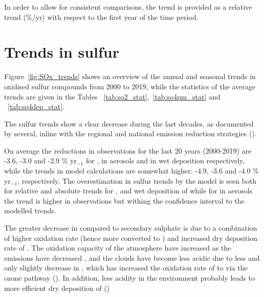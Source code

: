 In order to allow for consistent comparisons, the trend is provided as a relative trend (\%/yr) with respect to the first year of the time period.



\section{\label{sec:Trends_sulfur}Trends in sulfur}

Figure~\ref{fig:SOx_trends} shows an overview of the annual and seasonal trends in oxidised sulfur compounds from 2000 to 2019, while the statistics of the average trends are given in the Tables ~\ref{tab:so2_stat},~\ref{tab:so4pm_stat} and ~\ref{tab:so4dep_stat}.

The sulfur trends show a clear decrease during the last decades, as documented by several, inline with the regional and national emission reduction strategies (\cite{aas2019global, Colette2012, Vivanco2018, Theobald2019, Colette2021, Banzhaf2015, torseth2012, Crippa2016}).

On average the reductions in observations for the last 20 years (2000-2019) are -3.6, -3.0 and -2.9  \% yr$_{-1}$ for \soii, \soiv in aerosols and in wet deposition respectively, while the trends in model calculations are somewhat higher: -4.9, -3.6 and -4.0 \% yr$_{-1}$, respectively. The overestimation in sulfur trends by the model is seen both for relative and absolute trends for \soii, and wet deposition of \soiv while for \soiv in aerosols the trend is higher in observations but withing the confidence interval to the modelled trends. 

The  greater decrease in \soii compared to secondary sulphate is due to a combination of higher oxidation rate (hence more \soii converted to \soiv) and increased dry deposition rate of \soii. The oxidation capacity of the atmosphere have increased as the emissions have decreased \cite{Dalsoren2016}, and the clouds have become less acidic due to less \soii and only slightly decrease in \nhiii, which has increased the oxidation rate of \soii to \soiv via the ozone pathway (\cite{Banzhaf2015, Redington2009}). In addition, less acidity in the environment probably leads to more efficient dry deposition of \soii (\cite{Fowler_et_al:2009}) 




